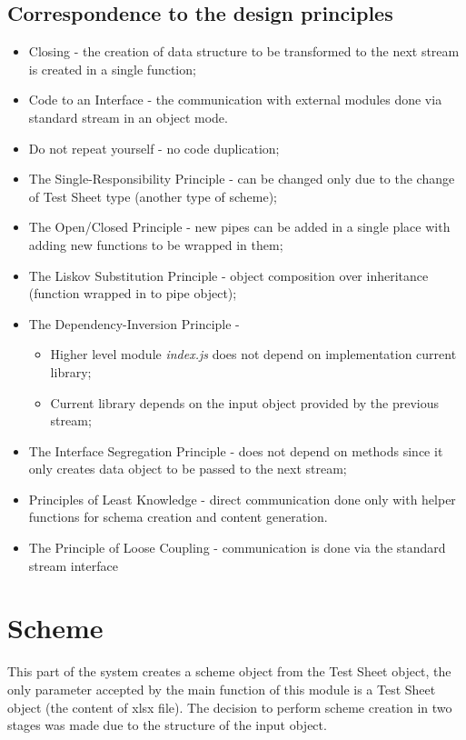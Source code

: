 \subsection{Correspondence to the design principles}
\begin{itemize}
	\item Closing - the creation of data structure to be transformed to the next stream is created in a single function;
	\item Code to an Interface - the communication with external modules done via standard stream in an object mode. 
	\item Do not repeat yourself - no code duplication;
	\item The Single-Responsibility Principle - can be changed only due to the change of Test Sheet type (another type of scheme);
	\item The Open/Closed Principle - new pipes can be added in a single place with adding new functions to be wrapped in them;
	\item The Liskov Substitution Principle - object composition over inheritance (function wrapped in to pipe object);
	\item The Dependency-Inversion Principle - 
				\begin{itemize}
					\item Higher level module \textit{index.js} does not depend on implementation current library;
					\item Current library depends on the input object provided by the previous stream;
				\end{itemize}
	\item The Interface Segregation Principle -  does not depend on methods since it only creates data object to be passed to the next stream;
	\item Principles of Least Knowledge - direct communication done only with helper functions for schema creation and content generation. 
	\item The Principle of Loose Coupling - communication is done via the standard stream interface
\end{itemize}


\section{Scheme}
\label{sec:scheme}
This part of the system creates a scheme object from the Test Sheet object, the only parameter accepted by the main function of this module is a Test Sheet object (the content of xlsx file).
The decision to perform scheme creation in two stages was made due to the structure of the input object.

